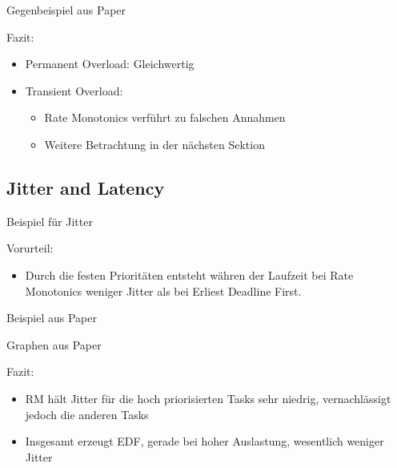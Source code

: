\begin{frame}{\subsubsecname}
	Gegenbeispiel aus Paper
\end{frame}

\begin{frame}{\subsubsecname}
	
\end{frame}

\begin{frame}{\subsecname}
	Fazit:
	\begin{itemize}
		\item Permanent Overload: Gleichwertig
		\item Transient Overload:
		\begin{itemize}
			\item Rate Monotonics verführt zu falschen Annahmen
			\item Weitere Betrachtung in der nächsten Sektion
		\end{itemize}
	\end{itemize}
\end{frame}

\subsection{Jitter and Latency}

\begin{frame}{\subsecname}
	Beispiel für Jitter
\end{frame}

\begin{frame}{\subsecname}
	Vorurteil:
	\begin{itemize}
		\item Durch die festen Prioritäten entsteht währen der Laufzeit bei Rate Monotonics weniger Jitter als bei Erliest Deadline First. 
	\end{itemize}
\end{frame}

\begin{frame}{\subsecname}
	Beispiel aus Paper
\end{frame}

\begin{frame}{\subsecname}
	Graphen aus Paper
\end{frame}

\begin{frame}{\subsecname}
	Fazit:
	\begin{itemize}
		\item RM hält Jitter für die hoch priorisierten Tasks sehr niedrig, vernachlässigt jedoch die anderen Tasks
		\item Insgesamt erzeugt EDF, gerade bei hoher Auslastung, wesentlich weniger Jitter
	\end{itemize}
\end{frame}

